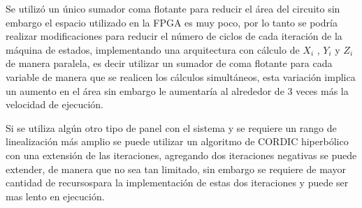 \begin{compactitem}

\item Se utilizó un único sumador coma flotante para reducir el área del circuito sin embargo el espacio utilizado en la FPGA es muy poco, por lo tanto se podría realizar modificaciones para reducir el número de ciclos de cada iteración de la máquina de estados, implementando una arquitectura con cálculo de $ X_i $ , $ Y_i$ y $ Z_i$ de manera paralela, es decir utilizar un sumador de coma flotante para cada variable de manera que se realicen los cálculos simultáneos, esta variación implica un aumento en el área sin embargo le aumentaría al alrededor de 3 veces más la velocidad de ejecución.

\item Si se utiliza algún otro tipo de panel con el sistema y se requiere un rango de linealización más amplio se puede utilizar un algoritmo de CORDIC hiperbólico con una extensión de las iteraciones, agregando dos iteraciones negativas se puede extender, de manera que no sea tan limitado, sin embargo se requiere de mayor cantidad de recursospara la implementación de estas dos iteraciones y puede ser mas lento en ejecución.  

\end{compactitem}
